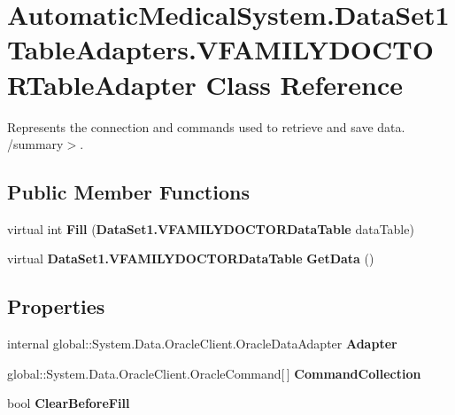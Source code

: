 \section{AutomaticMedicalSystem.DataSet1TableAdapters.VFAMILYDOCTORTableAdapter Class Reference}
\label{class_automatic_medical_system_1_1_data_set1_table_adapters_1_1_v_f_a_m_i_l_y_d_o_c_t_o_r_table_adapter}
Represents the connection and commands used to retrieve and save data. /summary$>$.  


\subsection*{Public Member Functions}
\begin{CompactItemize}
\item 
virtual int \textbf{Fill} ({\bf DataSet1.VFAMILYDOCTORDataTable} dataTable)\label{class_automatic_medical_system_1_1_data_set1_table_adapters_1_1_v_f_a_m_i_l_y_d_o_c_t_o_r_table_adapter_8cb07d87f2f013ed5a517a9369932dcb}

\item 
virtual {\bf DataSet1.VFAMILYDOCTORDataTable} \textbf{GetData} ()\label{class_automatic_medical_system_1_1_data_set1_table_adapters_1_1_v_f_a_m_i_l_y_d_o_c_t_o_r_table_adapter_f815eb29138a64d861391367947c9193}

\end{CompactItemize}
\subsection*{Properties}
\begin{CompactItemize}
\item 
internal global::System.Data.OracleClient.OracleDataAdapter \textbf{Adapter}\hspace{0.3cm}{\tt  [get]}\label{class_automatic_medical_system_1_1_data_set1_table_adapters_1_1_v_f_a_m_i_l_y_d_o_c_t_o_r_table_adapter_a30fd06254029e1d74512b16b4116e9d}

\item 
global::System.Data.OracleClient.OracleCommand[$\,$] \textbf{CommandCollection}\hspace{0.3cm}{\tt  [get]}\label{class_automatic_medical_system_1_1_data_set1_table_adapters_1_1_v_f_a_m_i_l_y_d_o_c_t_o_r_table_adapter_739481877ef8cff7bf0e842bddb0a7d7}

\item 
bool \textbf{ClearBeforeFill}\hspace{0.3cm}{\tt  [get, set]}\label{class_automatic_medical_system_1_1_data_set1_table_adapters_1_1_v_f_a_m_i_l_y_d_o_c_t_o_r_table_adapter_5100294094b6027e4f10b06036a4ef4d}

\end{CompactItemize}


